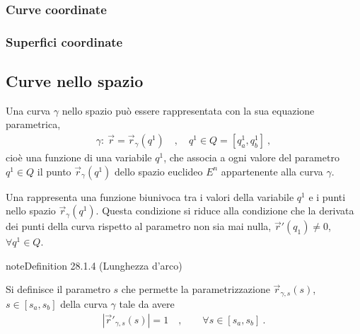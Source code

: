 \documentclass[letterpaper,10pt,italian]{jupyterBook}
\begin{document}
\subsubsection{Curve coordinate}
\label{\detokenize{ch/vector-calculus/geometry:curve-coordinate}}\label{\detokenize{ch/vector-calculus/geometry:vector-calculus-geometry-coordinate-lines}}

\subsubsection{Superfici coordinate}
\label{\detokenize{ch/vector-calculus/geometry:superfici-coordinate}}\label{\detokenize{ch/vector-calculus/geometry:vector-calculus-geometry-coordiante-sufraces}}

\subsection{Curve nello spazio}
\label{\detokenize{ch/vector-calculus/geometry:curve-nello-spazio}}\label{\detokenize{ch/vector-calculus/geometry:vector-calculus-geometry-lines}}
\sphinxAtStartPar
Una curva \(\gamma\) nello spazio può essere rappresentata con la sua equazione parametrica,
\begin{equation*}
\begin{split}\gamma: \ \vec{r} = \vec{r}_{\gamma}(q^1) \quad , \quad q^1 \in Q = [q^1_a, q^1_b] \ ,\end{split}
\end{equation*}
\sphinxAtStartPar
cioè una funzione di una variabile \(q^1\), che associa a ogni valore del parametro \(q^1 \in Q\) il punto \(\vec{r}_\gamma(q^1)\) dello spazio euclideo \(E^n\) appartenente alla curva \(\gamma\).

\sphinxAtStartPar
Una  rappresenta una funzione biunivoca tra i valori della variabile \(q^1\) e i punti nello spazio \(\vec{r}_{\gamma}(q^1)\). Questa condizione si riduce alla condizione che la derivata dei punti della curva rispetto al parametro non sia mai nulla, \(\vec{r}'(q_1) \ne 0\), \(\forall q^{1} \in Q\).
\label{ch/vector-calculus/geometry:arc-length}
\begin{sphinxadmonition}{note}{Definition 28.1.4 (Lunghezza d’arco)}



\sphinxAtStartPar
Si definisce  il parametro \(s\) che permette la parametrizzazione \(\vec{r}_{\gamma,s}(s)\), \(s \in [s_a, s_b]\) della curva \(\gamma\) tale da avere
\begin{equation*}
\begin{split}|\vec{r}'_{\gamma,s}(s)| = 1 \quad , \qquad \forall s \in [s_a, s_b] \ .\end{split}
\end{equation*}\end{sphinxadmonition}
\end{document}
